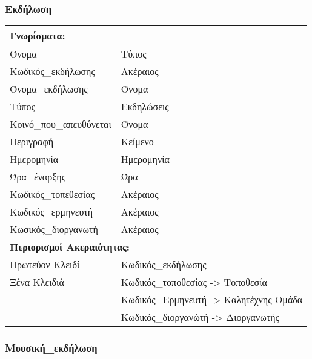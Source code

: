 \subsubsection{Εκδήλωση}

\begin{tabular}{|p{6cm}|p{8cm}|}
  \multicolumn{2}{l}{\textbf{Γνωρίσματα:}}                         \\ \hline
  Όνομα                   & Τύπος                                  \\ \hline
  Κωδικός\_εκδήλωσης      & Ακέραιος                               \\ \hline
  Όνομα\_εκδήλωσης        & Όνομα                                  \\ \hline
  Τύπος                   & Εκδηλώσεις                             \\ \hline
  Κοινό\_που\_απευθύνεται & Όνομα                                  \\ \hline
  Περιγραφή               & Κείμενο                                \\ \hline
  Ημερομηνία              & Ημερομηνία                             \\ \hline
  Ώρα\_έναρξης            & Ώρα                                    \\ \hline
  Κωδικός\_τοπεθεσίας     & Ακέραιος                               \\ \hline
  Κωδικός\_ερμηνευτή      & Ακέραιος                               \\ \hline
  Κωσικός\_διοργανωτή     & Ακέραιος                               \\ \hline
  \multicolumn{2}{l}{\textbf{Περιορισμοί Ακεραιότητας:}}           \\ \hline
  Πρωτεύον Κλειδί         & Κωδικός\_εκδήλωσης                     \\ \hline
  Ξένα Κλειδιά            & Κωδικός\_τοποθεσίας -> Τοποθεσία       \\ \cline{2-2}
                          & Κωδικός\_Ερμηνευτή -> Καλητέχνης-Ομάδα \\ \cline{2-2}
                          & Κωδικός\_διοργανώτή -> Διοργανωτής     \\ \hline
\end{tabular}

\subsubsection{Μουσική\_εκδήλωση}

